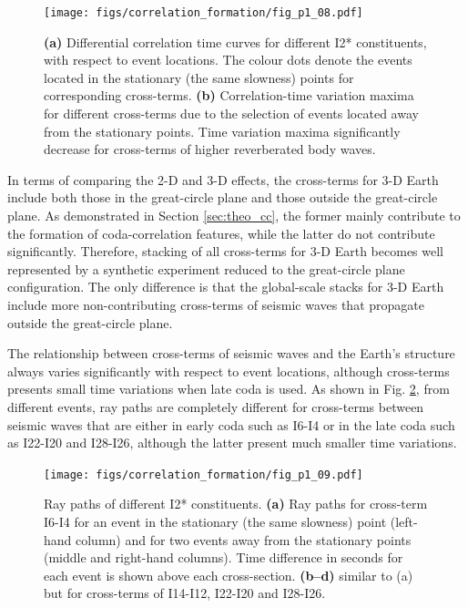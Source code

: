 \begin{figure}[!hbt]
	\centering
	\texttt{[image: figs/correlation\_formation/fig\_p1\_08.pdf]}
	\caption[Variation of individual I2* constituent due to event locations]
    {
		\textbf{(a)} Differential correlation time curves for different I2* constituents, with respect to event locations. The colour dots denote the events located in the stationary (the same slowness) points for corresponding cross-terms. \textbf{(b)} Correlation-time variation maxima for different cross-terms due to the selection of events located away from the stationary points. Time variation maxima significantly decrease for cross-terms of higher reverberated body waves.
	}
	\label{fig:2.8}
\end{figure}




In terms of comparing the 2-D and 3-D effects, the cross-terms for 3-D Earth include both those in the great-circle plane and those outside the great-circle plane. As demonstrated in Section \ref{sec:theo_cc}, the former mainly contribute to the formation of coda-correlation features, while the latter do not contribute significantly. Therefore, stacking of all cross-terms for 3-D Earth becomes well represented by a synthetic experiment reduced to the great-circle plane configuration. The only difference is that the global-scale stacks for 3-D Earth include more non-contributing cross-terms of seismic waves that propagate outside the great-circle plane.

The relationship between cross-terms of seismic waves and the Earth's structure always varies significantly with respect to event locations, although cross-terms presents small time variations when late coda is used. As shown in Fig. \ref{fig:2.9}, from different events, ray paths are completely different for cross-terms between seismic waves that are either in early coda such as I6-I4 or in the late coda such as I22-I20 and I28-I26, although the latter present much smaller time variations.


\begin{figure}[!hbt]
	\centering
	\texttt{[image: figs/correlation\_formation/fig\_p1\_09.pdf]}
	\caption[Ray paths of different I2* constituents]
    {
		Ray paths of different I2* constituents. \textbf{(a)} Ray paths for cross-term I6-I4 for an event in the stationary (the same slowness) point (left-hand column) and for two events away from the stationary points (middle and right-hand columns). Time difference in seconds for each event is shown above each cross-section. \textbf{(b--d)} similar to (a) but for cross-terms of I14-I12, I22-I20 and I28-I26.
	}
	\label{fig:2.9}
\end{figure}




